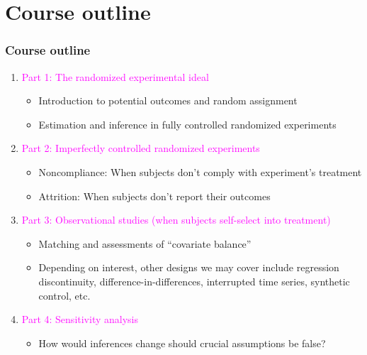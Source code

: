 \documentclass[table, xcolor = {dvipsnames}, 9pt]{beamer}
\theoremstyle{plain}
\begin{document}
\section{Course outline}
\begin{frame}[t]
\frametitle{Course outline}
\vfill
\begin{enumerate} \vfill
\item[] \textcolor{magenta}{Part 1: The randomized experimental ideal} \vfill
\begin{itemize} \vfill
\item Introduction to potential outcomes and random assignment \vfill
\item Estimation and inference in fully controlled randomized experiments \vfill
\end{itemize} \vfill
\item[] \textcolor{magenta}{Part 2: Imperfectly controlled randomized experiments} \vfill
\begin{itemize} \vfill
\item Noncompliance: When subjects don't comply with experiment's treatment \vfill
\item Attrition: When subjects don't report their outcomes \vfill
\end{itemize} \vfill
\item[] \textcolor{magenta}{Part 3: Observational studies (when subjects self-select into treatment)} \vfill
\begin{itemize} \vfill
\item Matching and assessments of ``covariate balance'' \vfill
\item Depending on interest, other designs we may cover include regression discontinuity, difference-in-differences, interrupted time series, synthetic control, etc. \vfill
\end{itemize} \vfill
\item[] \textcolor{magenta}{Part 4: Sensitivity analysis} \vfill
\begin{itemize} \vfill
\item How would inferences change should crucial assumptions be false? \vfill
\end{itemize} \vfill
\end{enumerate}
\vfill
\end{frame}
\end{document}
